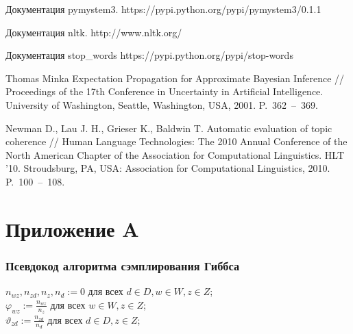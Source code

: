 \documentclass[a4paper]{report}
\begin{document}
\begin{thebibliography}{9}
		Документация pymystem3. https://pypi.python.org/pypi/pymystem3/0.1.1
		
		Документация nltk. 
		http://www.nltk.org/
		
		Документация stop\_words
		https://pypi.python.org/pypi/stop-words
		
		Thomas Minka Expectation Propagation for Approximate Bayesian Inference //
		Proceedings of the 17th Conference in Uncertainty in Artificial Intelligence. University of Washington, Seattle, Washington, USA, 2001. P.~362~--~369.
		
		
		Newman D., Lau J. H., Grieser K., Baldwin T. 
		Automatic evaluation of topic coherence // 
		Human Language Technologies: The 2010 Annual Conference of the
North American Chapter of the Association for Computational Linguistics. HLT
’10. Stroudsburg, PA, USA: Association for Computational Linguistics, 2010. P.~100~--~108.
		
	
	\end{thebibliography}
    \endgroup
    
	\section{Приложение A}
	\subsubsection{Псевдокод алгоритма сэмплирования Гиббса}
	
	\begin{algorithm}[H]
		\SetAlgoLined
		$ n_{wz}, n_{zd}, n_z, n_d := 0 $ для всех $d \in D, w \in W, z \in Z$; \\
		$\varphi_{wz} := \frac{n_{wz}}{n_z} $ для всех $w \in W, z \in Z$; \\
		$\vartheta_{zd} := \frac{n_{zd}}{n_d} $ для всех $d \in D, z \in Z$;
		
		
		
		
\end{algorithm}
	
	
	
	
\end{document}
